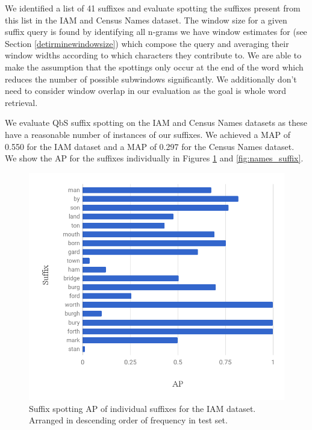 \documentclass[ms,electronic,twosidetoc,letterpaper,chaptercenter,parttop,lof,lot]{byumsphd}
\begin{document}
We identified a list of 41 suffixes and evaluate spotting the suffixes present from this list in the IAM and Census Names dataset. 
 The window size for a given suffix query is found by identifying all n-grams we have window estimates for (see Section \ref{detirminewindowsize}) which compose the query and averaging their window widths according to which characters they contribute to.
We are able to make the assumption that the spottings only occur at the end of the word which reduces the number of possible subwindows significantly. We additionally don't need to consider window overlap in our evaluation as the goal is whole word retrieval.

We evaluate QbS suffix spotting on the IAM and Census Names datasets as these have a reasonable number of instances of our suffixes. We achieved a MAP of 0.550 for the IAM dataset and a MAP of 0.297 for the Census Names dataset. We show the AP for the suffixes individually in Figures \ref{fig:IAM_suffix} and \ref{fig:names_suffix}.




\begin{figure}
    \centering
    \includegraphics[width=.75\textwidth]{suffix_IAM_ap}
    \caption{Suffix spotting AP of individual suffixes for the IAM dataset. Arranged in descending order of frequency in test set.}
    \label{fig:IAM_suffix}
\end{figure}
\end{document}
